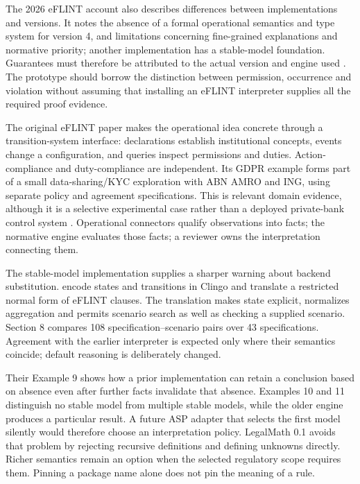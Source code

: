 The 2026 eFLINT account also describes differences between implementations and
versions. It notes the absence of a formal operational semantics and type system
for version 4, and limitations concerning fine-grained explanations and normative
priority; another implementation has a stable-model foundation. Guarantees must
therefore be attributed to the actual version and engine used
\citep[secs.~6--7]{eflint2026}. The prototype should borrow the distinction between
permission, occurrence and violation without assuming that installing an eFLINT
interpreter supplies all the required proof evidence.

The original eFLINT paper makes the operational idea concrete through a
transition-system interface: declarations establish institutional concepts,
events change a configuration, and queries inspect permissions and duties.
Action-compliance and duty-compliance are independent. Its GDPR example forms
part of a small data-sharing/KYC exploration with ABN AMRO and ING, using separate
policy and agreement specifications. This is relevant domain evidence, although
it is a selective experimental case rather than a deployed private-bank control
system \citep[secs.~3--5]{eflint2020}. Operational connectors qualify observations
into facts; the normative engine evaluates those facts; a reviewer owns the
interpretation connecting them.

The stable-model implementation supplies a sharper warning about backend
substitution. \citet[secs.~4--7]{eflintstable2025} encode states and transitions
in Clingo and translate a restricted normal form of eFLINT clauses. The
translation makes state explicit, normalizes aggregation and permits scenario
search as well as checking a supplied scenario. Section 8 compares 108
specification--scenario pairs over 43 specifications. Agreement with the earlier
interpreter is expected only where their semantics coincide; default reasoning
is deliberately changed.

Their Example 9 shows how a prior implementation can retain a conclusion based
on absence even after further facts invalidate that absence. Examples 10 and 11
distinguish no stable model from multiple stable models, while the older engine
produces a particular result. A future ASP adapter that selects the first model
silently would therefore choose an interpretation policy. LegalMath 0.1 avoids
that problem by rejecting recursive definitions and defining unknowns directly.
Richer semantics remain an option when the selected regulatory scope requires
them. Pinning a package name alone does not pin the meaning of a rule.

